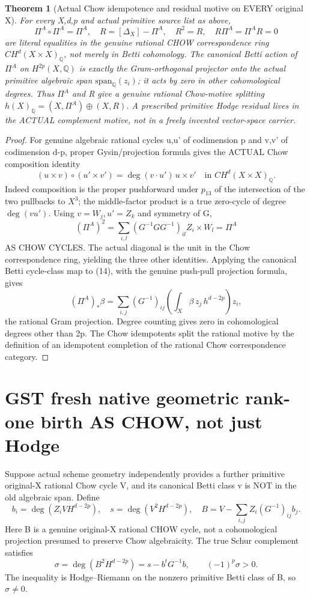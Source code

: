 \documentclass[11pt]{article}
\newcommand{\Q}{\mathbb Q}
\newtheorem{theorem}{Theorem}
\begin{document}
\begin{theorem}[Actual Chow idempotence and residual motive on EVERY original X]
For every X,d,p and actual primitive source list as above,
\[
 \boxed{\Pi^A\circ\Pi^A=\Pi^A,\quad
 R=[\Delta_X]-\Pi^A,\quad
 R^2=R,\quad R\Pi^A=\Pi^AR=0}
                                                               \tag{15}
\]
are literal equalities in the genuine rational CHOW correspondence
ring \(CH^d(X\times X)_\Q\), not merely in Betti cohomology.
The canonical Betti action of \(\Pi^A\) on \(H^{2p}(X,\Q)\)
is exactly the Gram-orthogonal projector onto the actual primitive
algebraic span \(\mathrm{span}_\Q(z_i)\); it acts by zero in
other cohomological degrees. Thus \(\Pi^A\) and R give a
genuine rational Chow-motive splitting
\(h(X)_\Q=(X,\Pi^A)\oplus(X,R)\).
A prescribed primitive Hodge residual lives in the ACTUAL
complement motive, not in a freely invented vector-space carrier.
\end{theorem}
\begin{proof}
For genuine algebraic rational cycles u,u' of codimension p
and v,v' of codimension d-p, proper Gysin/projection formula
gives the ACTUAL Chow composition identity
\[
 \boxed{(u\times v)\circ(u'\times v')
  =\deg(v\cdot u')\,u\times v'
       \quad\text{in } CH^d(X\times X)_\Q.}         \tag{16}
\]
Indeed composition is the proper pushforward under \(p_{13}\)
of the intersection of the two pullbacks to \(X^3\);
the middle-factor product is a true zero-cycle of degree
\(\deg(vu')\). Using \(v=W_j,u'=Z_k\) and symmetry of G,
\[
 (\Pi^A)^2
 =\sum_{i,l}(G^{-1}GG^{-1})_{il}Z_i\times W_l
 =\Pi^A
\]
AS CHOW CYCLES. The actual diagonal is the unit in the Chow
correspondence ring, yielding the three other identities.
Applying the canonical Betti cycle-class map to (14), with the
genuine push-pull projection formula, gives
\[
 (\Pi^A)_*\beta=\sum_{i,j}
   (G^{-1})_{ij}
   \left(\int_X\beta\,z_j\,h^{d-2p}\right)z_i,
\]
the rational Gram projection. Degree counting gives zero
in cohomological degrees other than 2p. The Chow idempotents
split the rational motive by the definition of an idempotent
completion of the rational Chow correspondence category.
\end{proof}

\section{GST fresh native geometric rank-one birth AS CHOW, not just Hodge}
Suppose actual scheme geometry independently provides a further
primitive original-X rational Chow cycle V, and its canonical
Betti class v is NOT in the old algebraic span. Define
\[
 b_i=\deg(Z_i V H^{d-2p}),\quad s=\deg(V^2H^{d-2p}),
\quad
 B=V-\sum_{i,j}Z_i(G^{-1})_{ij}b_j .
\]
Here B is a genuine original-X rational CHOW cycle, not
a cohomological projection presumed to preserve Chow algebraicity.
The true Schur complement satisfies
\[
 \boxed{\sigma=\deg(B^2H^{d-2p})
          =s-b^tG^{-1}b,\qquad (-1)^p\sigma>0.}    \tag{17}
\]
The inequality is Hodge--Riemann on the nonzero primitive
Betti class of B, so \(\sigma\ne0\).
\end{document}
